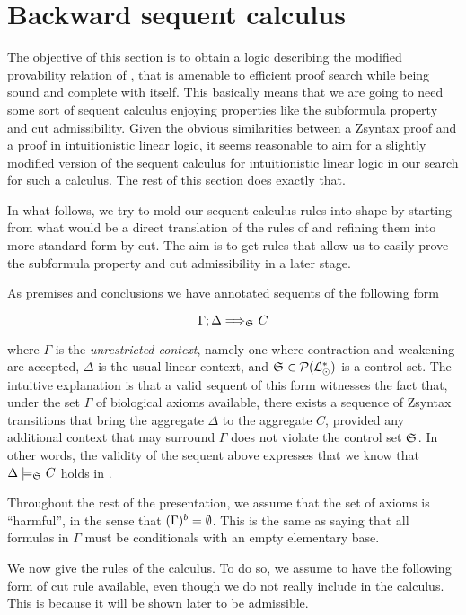 \section{Backward sequent calculus}

The objective of this section is to obtain a logic describing the modified
provability relation of \eznd{}, that is amenable to efficient proof search
while being sound and complete with \eznd{} itself. This basically means that we
are going to need some sort of sequent calculus enjoying properties like the
subformula property and cut admissibility.  Given the obvious similarities
between a Zsyntax proof and a proof in intuitionistic linear logic, it seems
reasonable to aim for a slightly modified version of the sequent calculus for
intuitionistic linear logic in our search for such a calculus. The rest of this
section does exactly that.

In what follows, we try to mold our sequent calculus rules into shape by
starting from what would be a direct translation of the rules of \eznd{} and
refining them into more standard form by cut. The aim is to get rules that
allow us to easily prove the subformula property and cut admissibility in a
later stage.

As premises and conclusions we have annotated sequents of the following form

\[
  \Gamma ; \Delta \Longrightarrow_{\mathfrak{S}_{}} C
\]

where $\Gamma$ is the \emph{unrestricted context}, namely one where contraction
and weakening are accepted, $\Delta$ is the usual linear context, and
$\mathfrak{S}_{} \in \mathcal{P}(\mathcal{L}_{\odot}^*)$ is a control set. The intuitive
explanation is that a valid sequent of this form witnesses the fact that, under
the set $\Gamma$ of biological axioms available, there exists a sequence of
Zsyntax transitions that bring the aggregate $\Delta$ to the aggregate $C$,
provided any additional context that may surround $\Gamma$ does not violate the
control set $\mathfrak{S}_{}$. In other words, the validity of the sequent above
expresses that we know that $\Delta \models_{\mathfrak{S}_{}} C$ holds in \eznd{}.

Throughout the rest of the presentation, we assume that the set of axioms is
``harmful'', in the sense that $(\Gamma)^{b} = \emptyset$.
This is the same as saying that all formulas in $\Gamma$ must be conditionals
with an empty elementary base.

We now give the rules of the calculus. To do so, we assume to have the following
form of cut rule available, even though we do not really include in the
calculus. This is because it will be shown later to be admissible.

